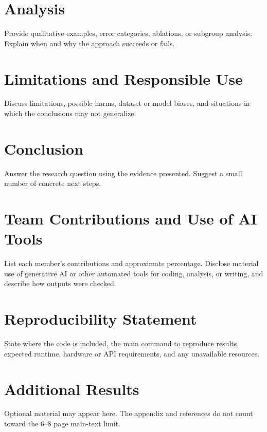 \documentclass[10pt]{article}
\begin{document}
\section{Analysis}
Provide qualitative examples, error categories, ablations, or subgroup analysis. Explain when and why the approach succeeds or fails.

\section{Limitations and Responsible Use}
Discuss limitations, possible harms, dataset or model biases, and situations in which the conclusions may not generalize.

\section{Conclusion}
Answer the research question using the evidence presented. Suggest a small number of concrete next steps.

\section*{Team Contributions and Use of AI Tools}
List each member's contributions and approximate percentage. Disclose material use of generative AI or other automated tools for coding, analysis, or writing, and describe how outputs were checked.

\section*{Reproducibility Statement}
State where the code is included, the main command to reproduce results, expected runtime, hardware or API requirements, and any unavailable resources.




\appendix
\section{Additional Results}
Optional material may appear here. The appendix and references do not count toward the 6--8 page main-text limit.
\end{document}
